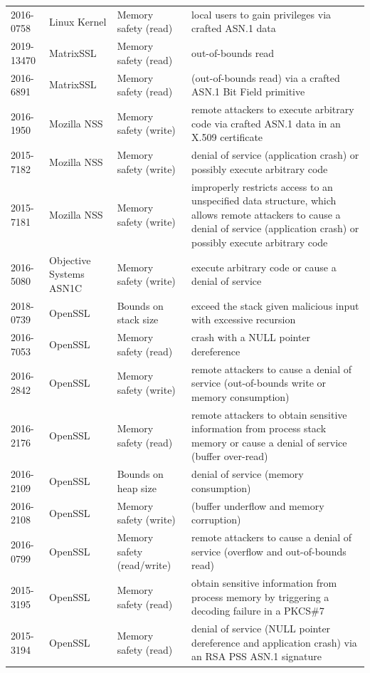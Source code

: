 \documentclass[acmsmall,nonacm]{acmart}
\begin{document}
\begin{longtable}{ l l l p{15em} }
2016-0758    & Linux Kernel  & Memory safety (read) & local users to gain privileges via crafted ASN.1 data \\ 
2019-13470   & MatrixSSL     & Memory safety (read) & out-of-bounds read \\ 
2016-6891    & MatrixSSL     & Memory safety (read) & (out-of-bounds read) via a crafted ASN.1 Bit Field primitive \\ 
2016-1950    & Mozilla NSS   & Memory safety (write) & remote attackers to execute arbitrary code via crafted ASN.1 data in an X.509 certificate \\ 
2015-7182    & Mozilla NSS   & Memory safety (write) & denial of service (application crash) or possibly execute arbitrary code \\ 
2015-7181    & Mozilla NSS   & Memory safety (write) & improperly restricts access to an unspecified data structure, which allows remote attackers to cause a denial of service (application crash) or possibly execute arbitrary code \\ 
2016-5080    & Objective Systems ASN1C & Memory safety (write) & execute arbitrary code or cause a denial of service \\ 
2018-0739    & OpenSSL       & Bounds on stack size & exceed the stack given malicious input with excessive recursion \\ 
2016-7053    & OpenSSL       & Memory safety (read) & crash with a NULL pointer dereference \\ 
2016-2842    & OpenSSL       & Memory safety (write) & remote attackers to cause a denial of service (out-of-bounds write or memory consumption) \\ 
2016-2176    & OpenSSL       & Memory safety (read) & remote attackers to obtain sensitive information from process stack memory or cause a denial of service (buffer over-read) \\ 
2016-2109    & OpenSSL       & Bounds on heap size & denial of service (memory consumption) \\ 
2016-2108    & OpenSSL       & Memory safety (write) & (buffer underflow and memory corruption) \\ 
2016-0799    & OpenSSL       & Memory safety (read/write) & remote attackers to cause a denial of service (overflow and out-of-bounds read) \\ 
2015-3195    & OpenSSL       & Memory safety (read) & obtain sensitive information from process memory by triggering a decoding failure in a PKCS\#7 \\ 
2015-3194    & OpenSSL       & Memory safety (read) & denial of service (NULL pointer dereference and application crash) via an RSA PSS ASN.1 signature \\ 

\end{longtable}
\end{document}
